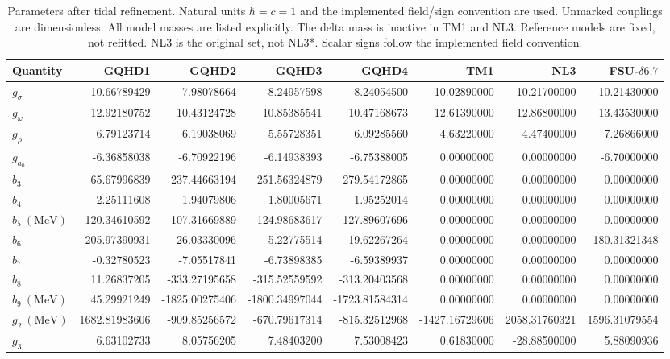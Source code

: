 \begin{table}[t]
\centering
\scriptsize
\caption{Parameters after tidal refinement. Natural units $\hbar=c=1$ and the implemented field/sign convention are used. Unmarked couplings are dimensionless. All model masses are listed explicitly. The delta mass is inactive in TM1 and NL3. Reference models are fixed, not refitted. NL3 is the original set, not NL3*. Scalar signs follow the implemented field convention.}
\label{tab:parameters}
\begin{tabular}{lrrrrrrr}
\hline
Quantity & GQHD1 & GQHD2 & GQHD3 & GQHD4 & TM1 & NL3 & FSU-$\delta6.7$ \\
\hline
$g_\sigma$ & -10.66789429 & 7.98078664 & 8.24957598 & 8.24054500 & 10.02890000 & -10.21700000 & -10.21430000 \\
$g_\omega$ & 12.92180752 & 10.43124728 & 10.85385541 & 10.47168673 & 12.61390000 & 12.86800000 & 13.43530000 \\
$g_\rho$ & 6.79123714 & 6.19038069 & 5.55728351 & 6.09285560 & 4.63220000 & 4.47400000 & 7.26866000 \\
$g_{a_0}$ & -6.36858038 & -6.70922196 & -6.14938393 & -6.75388005 & 0.00000000 & 0.00000000 & -6.70000000 \\
$b_{3}$ & 65.67996839 & 237.44663194 & 251.56324879 & 279.54172865 & 0.00000000 & 0.00000000 & 0.00000000 \\
$b_{4}$ & 2.25111608 & 1.94079806 & 1.80005671 & 1.95252014 & 0.00000000 & 0.00000000 & 0.00000000 \\
$b_{5}\ (\mathrm{MeV})$ & 120.34610592 & -107.31669889 & -124.98683617 & -127.89607696 & 0.00000000 & 0.00000000 & 0.00000000 \\
$b_{6}$ & 205.97390931 & -26.03330096 & -5.22775514 & -19.62267264 & 0.00000000 & 0.00000000 & 180.31321348 \\
$b_{7}$ & -0.32780523 & -7.05517841 & -6.73898385 & -6.59389937 & 0.00000000 & 0.00000000 & 0.00000000 \\
$b_{8}$ & 11.26837205 & -333.27195658 & -315.52559592 & -313.20403568 & 0.00000000 & 0.00000000 & 0.00000000 \\
$b_{9}\ (\mathrm{MeV})$ & 45.29921249 & -1825.00275406 & -1800.34997044 & -1723.81584314 & 0.00000000 & 0.00000000 & 0.00000000 \\
$g_{2}\ (\mathrm{MeV})$ & 1682.81983606 & -909.85256572 & -670.79617314 & -815.32512968 & -1427.16729606 & 2058.31760321 & 1596.31079554 \\
$g_{3}$ & 6.63102733 & 8.05756205 & 7.48403200 & 7.53008423 & 0.61830000 & -28.88500000 & 5.88090936 \\

\end{tabular}
\end{table}

